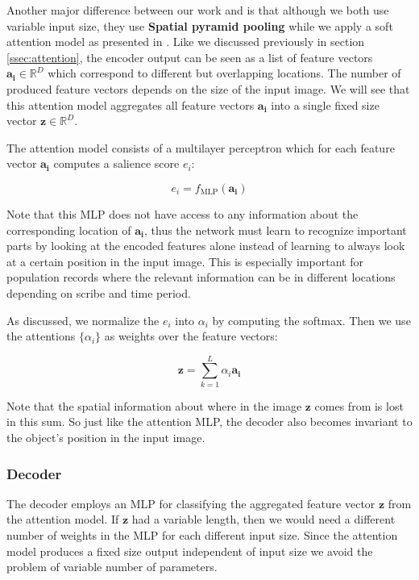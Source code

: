 Another major difference between our work and \cite{FornesCnnCategorization} is that although we both use variable input size, they use \textbf{Spatial pyramid pooling} while we apply a soft attention model as presented in \cite{AttendAndTell}. Like we discussed previously in section \ref{ssec:attention}, the encoder output can be seen as a list of feature vectors $\mathbf{a_i} \in \mathbb{R}^D$ which correspond to different but overlapping locations. The number of produced feature vectors depends on the size of the input image. We will see that this attention model aggregates all feature vectors $\mathbf{a_i}$ into a single fixed size vector $\mathbf{z} \in \mathbb{R}^D$.

The attention model consists of a multilayer perceptron which for each feature vector $\mathbf{a_i}$ computes a salience score $e_i$:

\[
e_i = f_\text{MLP}(\mathbf{a_i})
\]

Note that this MLP does not have access to any information about the corresponding location of $\mathbf{a_i}$, thus the network must learn to recognize important parts by looking at the encoded features alone instead of learning to always look at a certain position in the input image. This is especially important for population records where the relevant information can be in different locations depending on scribe and time period.

As discussed, we normalize the $e_i$ into $\alpha_i$ by computing the softmax. Then we use the attentions $\{\alpha_i\}$ as weights over the feature vectors:

\[
\mathbf{z} = \sum_{k=1}^L \alpha_i \mathbf{a_i}
\]

Note that the spatial information about where in the image $\mathbf{z}$ comes from is lost in this sum. So just like the attention MLP, the decoder also becomes invariant to the object's position in the input image.

\subsubsection{Decoder}

The decoder employs an MLP for classifying the aggregated feature vector $\mathbf{z}$ from the attention model.
If $\mathbf{z}$ had a variable length, then we would need a different number of weights in the MLP for each different input size. Since the attention model produces a fixed size output independent of input size we avoid the problem of variable number of parameters.

